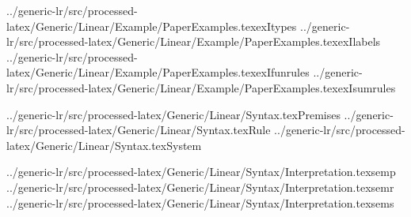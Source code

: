 
\def\prefix{../generic-lr/src/processed-latex}

\CatchFileBetweenTags{\exItypes}%
{\prefix/Generic/Linear/Example/PaperExamples.tex}{exItypes}
\CatchFileBetweenTags{\exIlabels}%
{\prefix/Generic/Linear/Example/PaperExamples.tex}{exIlabels}
\CatchFileBetweenTags{\exIfunrules}%
{\prefix/Generic/Linear/Example/PaperExamples.tex}{exIfunrules}
\CatchFileBetweenTags{\exIsumrules}%
{\prefix/Generic/Linear/Example/PaperExamples.tex}{exIsumrules}

\CatchFileBetweenTags{\Premises}%
{\prefix/Generic/Linear/Syntax.tex}{Premises}
\CatchFileBetweenTags{\Rule}%
{\prefix/Generic/Linear/Syntax.tex}{Rule}
\CatchFileBetweenTags{\System}%
{\prefix/Generic/Linear/Syntax.tex}{System}

\CatchFileBetweenTags{\semp}%
{\prefix/Generic/Linear/Syntax/Interpretation.tex}{semp}
\CatchFileBetweenTags{\semr}%
{\prefix/Generic/Linear/Syntax/Interpretation.tex}{semr}
\CatchFileBetweenTags{\sems}%
{\prefix/Generic/Linear/Syntax/Interpretation.tex}{sems}
